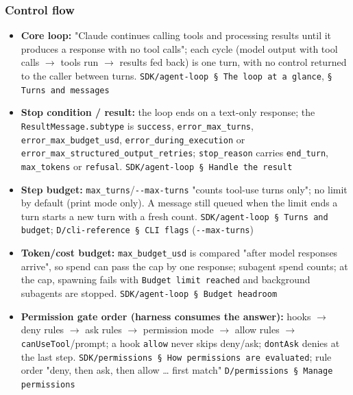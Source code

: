 \subsubsection*{Control flow}
\begin{itemize}
\item \textbf{Core loop:} "Claude continues calling tools and processing results until it produces a response with no tool calls"; each cycle (model output with tool calls $\rightarrow$ tools run $\rightarrow$ results fed back) is one turn, with no control returned to the caller between turns. \texttt{SDK/\allowbreak{}agent-\allowbreak{}loop § The loop at a glance}, \texttt{§ Turns and messages}
\item \textbf{Stop condition / result:} the loop ends on a text-only response; the \texttt{ResultMessage.\allowbreak{}subtype} is \texttt{success}, \texttt{error\_\allowbreak{}max\_\allowbreak{}turns}, \texttt{error\_\allowbreak{}max\_\allowbreak{}budget\_\allowbreak{}usd}, \texttt{error\_\allowbreak{}during\_\allowbreak{}execution} or \texttt{error\_\allowbreak{}max\_\allowbreak{}structured\_\allowbreak{}output\_\allowbreak{}retries}; \texttt{stop\_\allowbreak{}reason} carries \texttt{end\_\allowbreak{}turn}, \texttt{max\_\allowbreak{}tokens} or \texttt{refusal}. \texttt{SDK/\allowbreak{}agent-\allowbreak{}loop § Handle the result}
\item \textbf{Step budget:} \texttt{max\_\allowbreak{}turns}/\texttt{-\allowbreak{}-\allowbreak{}max-\allowbreak{}turns} "counts tool-use turns only"; no limit by default (print mode only). A message still queued when the limit ends a turn starts a new turn with a fresh count. \texttt{SDK/\allowbreak{}agent-\allowbreak{}loop § Turns and budget}; \texttt{D/\allowbreak{}cli-\allowbreak{}reference § CLI flags} (\texttt{-\allowbreak{}-\allowbreak{}max-\allowbreak{}turns})
\item \textbf{Token/cost budget:} \texttt{max\_\allowbreak{}budget\_\allowbreak{}usd} is compared "after model responses arrive", so spend can pass the cap by one response; subagent spend counts; at the cap, spawning fails with \texttt{Budget limit reached} and background subagents are stopped. \texttt{SDK/\allowbreak{}agent-\allowbreak{}loop § Budget headroom}
\item \textbf{Permission gate order (harness consumes the answer):} hooks $\rightarrow$ deny rules $\rightarrow$ ask rules $\rightarrow$ permission mode $\rightarrow$ allow rules $\rightarrow$ \texttt{canUseTool}/prompt; a hook \texttt{allow} never skips deny/ask; \texttt{dontAsk} denies at the last step. \texttt{SDK/\allowbreak{}permissions § How permissions are evaluated}; rule order "deny, then ask, then allow \ldots{} first match" \texttt{D/\allowbreak{}permissions § Manage permissions}

\end{itemize}
